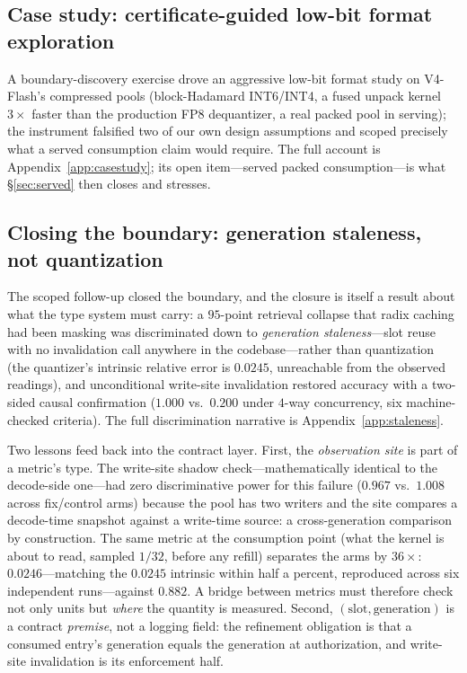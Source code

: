 \documentclass[11pt]{article}
\begin{document}
\subsection{Case study: certificate-guided low-bit format exploration}
A boundary-discovery exercise drove an aggressive low-bit format study on
V4-Flash's compressed pools (block-Hadamard INT6/INT4, a fused unpack kernel
$3\times$ faster than the production FP8 dequantizer, a real packed pool in
serving); the instrument falsified two of our own design assumptions and
scoped precisely what a served consumption claim would require. The full
account is Appendix~\ref{app:casestudy}; its open item---served packed
consumption---is what \S\ref{sec:served} then closes and stresses.

\subsection{Closing the boundary: generation staleness, not quantization}
\label{sec:generation}
The scoped follow-up closed the boundary, and the closure is itself a
result about what the type system must carry: a $95$-point retrieval
collapse that radix caching had been masking was discriminated down to
\emph{generation staleness}---slot reuse with no invalidation call
anywhere in the codebase---rather than quantization (the quantizer's
intrinsic relative error is $0.0245$, unreachable from the observed
readings), and unconditional write-site invalidation restored accuracy
with a two-sided causal confirmation ($1.000$ vs.\ $0.200$ under
$4$-way concurrency, six machine-checked criteria). The full
discrimination narrative is Appendix~\ref{app:staleness}.

Two lessons feed back into the contract layer. First, the \emph{observation
site} is part of a metric's type. The write-site shadow check---mathematically
identical to the decode-side one---had zero discriminative power for this
failure ($0.967$ vs.\ $1.008$ across fix/control arms) because the pool has
two writers and the site compares a decode-time snapshot against a write-time
source: a cross-generation comparison by construction. The same metric at the
consumption point (what the kernel is about to read, sampled $1/32$, before
any refill) separates the arms by $36\times$: $0.0246$---matching the
$0.0245$ intrinsic within half a percent, reproduced across six independent
runs---against $0.882$. A bridge between metrics must therefore check not
only units but \emph{where} the quantity is measured. Second,
$(\mathrm{slot}, \mathrm{generation})$ is a contract \emph{premise}, not a
logging field: the refinement obligation is that a consumed entry's
generation equals the generation at authorization, and write-site
invalidation is its enforcement half.
\end{document}

